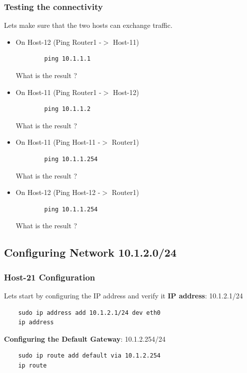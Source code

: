 \subsubsection{Testing the connectivity}
Lets make sure that the two hosts can exchange traffic.
\newline
\begin{itemize}
	\item On Host-12 (Ping Router1 -$>$ Host-11)
	\begin{verbatim}
	    ping 10.1.1.1
	\end{verbatim}

	What is the result ?
	\item On Host-11 (Ping Router1 -$>$ Host-12)
	\begin{verbatim}
	    ping 10.1.1.2
	\end{verbatim}

	What is the result ?
	\item On Host-11 (Ping Host-11 -$>$ Router1)
	\begin{verbatim}
	    ping 10.1.1.254
	\end{verbatim}

	What is the result ?
	\item On Host-12 (Ping Host-12 -$>$ Router1)
	\begin{verbatim}
	    ping 10.1.1.254
	\end{verbatim}

	What is the result ?
\end{itemize}


\subsection{Configuring Network 10.1.2.0/24}

\subsubsection{Host-21 Configuration}
Lets start by configuring the IP address and verify it
\newline
\newline
\textbf{IP address}: 10.1.2.1/24

\begin{verbatim}
    sudo ip address add 10.1.2.1/24 dev eth0
    ip address
\end{verbatim}

\textbf{Configuring the Default Gateway}: 10.1.2.254/24
\begin{verbatim}
    sudo ip route add default via 10.1.2.254
    ip route
\end{verbatim}

